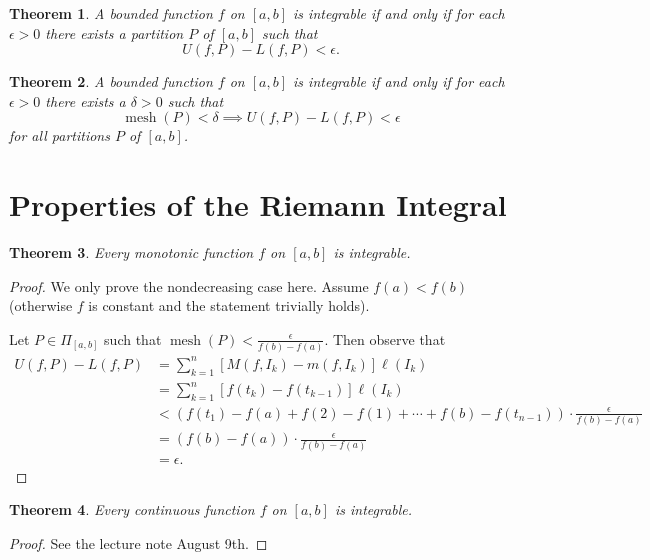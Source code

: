 \documentclass[12pt, lettersize]{book}
\theoremstyle{plain}
\newtheorem{thm}{Theorem}[section]
\theoremstyle{definition}
\theoremstyle{remark}
\DeclareMathOperator{\mesh}{mesh}
\begin{document}
			\begin{thm}
			A bounded function $f$ on $[a,b]$ is integrable if and only if for each $\epsilon>0$ there exists a partition $P$ of $[a,b]$ such that
			\begin{displaymath}
				U(f,P)-L(f,P)<\epsilon.
			\end{displaymath}
			\end{thm}
			
			\begin{thm}
			A bounded function $f$ on $[a,b]$ is integrable if and only if for each $\epsilon>0$ there exists a $\delta>0$ such that
			\begin{displaymath}
				\mesh(P)<\delta\implies U(f,P)-L(f,P)<\epsilon
			\end{displaymath}
			for all partitions $P$ of $[a,b]$.
			\end{thm}
			\newpage
		\section{Properties of the Riemann Integral}
			\begin{thm}
				Every monotonic function $f$ on $[a,b]$ is integrable.
			\end{thm}
			\begin{proof}
				We only prove the nondecreasing case here. Assume $f(a)<f(b)$ (otherwise $f$ is constant and the statement trivially holds).
				
				Let $P\in\Pi_{[a,b]}$ such that $\mesh(P)<\frac{\epsilon}{f(b)-f(a)}$. Then observe that
				\begin{align*}
					U(f,P)-L(f,P)&=\sum_{k=1}^{n}\left[M(f,I_k)-m(f,I_k)\right]\ell(I_k)\\
					&=\sum_{k=1}^{n}\left[f(t_k)-f(t_{k-1})\right]\ell(I_k)\\
					&<\left(f(t_1)-f(a)+f(2)-f(1)+\cdots+f(b)-f(t_{n-1})\right)\cdot\frac{\epsilon}{f(b)-f(a)}\\
					&=\left(f(b)-f(a)\right)\cdot\frac{\epsilon}{f(b)-f(a)}\\
					&=\epsilon.
				\end{align*}
			\end{proof}
			
			\begin{thm}
				Every continuous function $f$ on $[a,b]$ is integrable.
			\end{thm}
			\begin{proof}
				See the lecture note August 9th.
			\end{proof}
			
\end{document}
